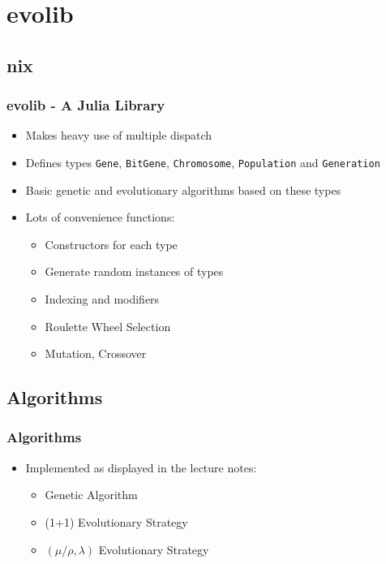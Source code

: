 \documentclass[%
14pt
]{beamer}
\begin{document}
\section{evolib}
\subsection{nix}
\begin{frame}
  \frametitle{evolib - A Julia Library}
  \begin{itemize}
    \item Makes heavy use of multiple dispatch
    \item Defines types \texttt{Gene}, \texttt{BitGene}, \texttt{Chromosome}, \texttt{Population} and \texttt{Generation}
    \item Basic genetic and evolutionary algorithms based on these types
    \item Lots of convenience functions:
      \begin{itemize}
        \item Constructors for each type
        \item Generate random instances of types
        \item Indexing and modifiers
        \item Roulette Wheel Selection
        \item Mutation, Crossover
      \end{itemize}
  \end{itemize}
\end{frame}

\subsection{Algorithms}
\begin{frame}
  \frametitle{Algorithms}
  \begin{spacing}{1.5}
    \begin{itemize}
      \item Implemented as displayed in the lecture notes:
        \begin{itemize}
          \item Genetic Algorithm
          \item (1+1) Evolutionary Strategy
          \item $(\mu/\rho, \lambda)$ Evolutionary Strategy
        \end{itemize}
    \end{itemize}
  \end{spacing}
\end{frame}
\end{document}
